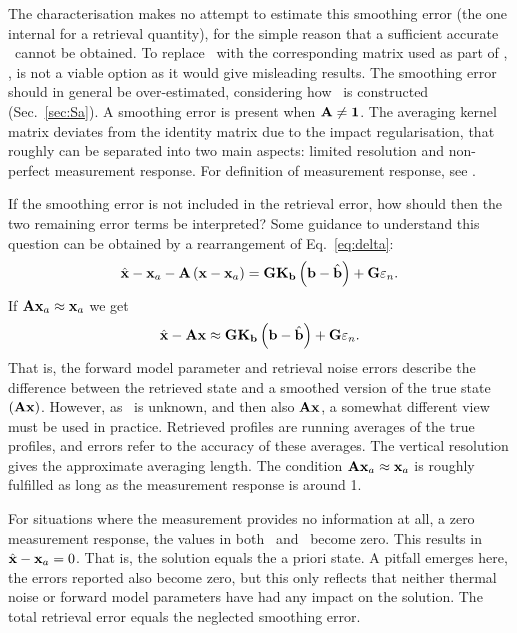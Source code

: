 The characterisation makes no attempt to estimate this smoothing error (the one
internal for a retrieval quantity), for the simple reason that a sufficient
accurate \aCvrMtr{\SttVct}\ cannot be obtained. To replace \aCvrMtr{\SttVct}\
with the corresponding matrix used as part of \OEM, , is not a
viable option as it would give misleading results. The smoothing error should
in general be over-estimated, considering how \aCvrMtr{\SttVct}\ is constructed
(Sec.~\ref{sec:Sa}). A smoothing error is present when $\mathbf{A}\neq\mathbf{1}$.
The averaging kernel matrix deviates from the identity matrix due to the impact
regularisation, that roughly can be separated into two main aspects: limited
resolution and non-perfect measurement response. For definition of measurement
response, see \citet{baron:studi:02}.

If the smoothing error is not included in the retrieval error, how should then
the two remaining error terms be interpreted? Some guidance to understand this
question can be obtained by a rearrangement of Eq.~\ref{eq:delta}:
\begin{equation}
  \hat{\mathbf{x}} -\mathbf{x}_{a} - \mathbf{A}\left( \mathbf{x}-\mathbf{x}_{a} \right) = 
    \mathbf{G}\mathbf{K}_{\mathbf{b}}\left(\mathbf{b}-\hat{\mathbf{b}}\right) +
    \mathbf{G}\varepsilon_n.
\end{equation}
If $\mathbf{A}\mathbf{x}_{a}\approx\mathbf{x}_{a}$ we get
\begin{equation}
  \hat{\mathbf{x}} - \mathbf{A}\mathbf{x} \approx 
    \mathbf{G}\mathbf{K}_{\mathbf{b}}\left(\mathbf{b}-\hat{\mathbf{b}}\right) +
    \mathbf{G}\varepsilon_n.
\end{equation}
That is, the forward model parameter and retrieval noise errors describe the
difference between the retrieved state and a smoothed version of the true state
$(\mathbf{A}\mathbf{x})$. However, as \SttVct\ is unknown, and then also
$\mathbf{A}\mathbf{x}$, a somewhat different view must be used in practice.
Retrieved profiles are running averages of the true profiles, and errors refer
to the accuracy of these averages. The vertical resolution gives the
approximate averaging length. The condition
$\mathbf{A}\mathbf{x}_{a}\approx\mathbf{x}_{a}$ is roughly fulfilled as long as the
measurement response is around 1.

For situations where the measurement provides no information at all, a zero
measurement response, the values in both \CtrFncMtr\ and \AvrKrnMtr\ become
zero. This results in $\hat{\mathbf{x}} - \mathbf{x}_{a} = 0$. That is, the solution equals
the a priori state. A pitfall emerges here, the errors reported also become
zero, but this only reflects that neither thermal noise or forward model
parameters have had any impact on the solution. The total retrieval error
equals the neglected smoothing error.



